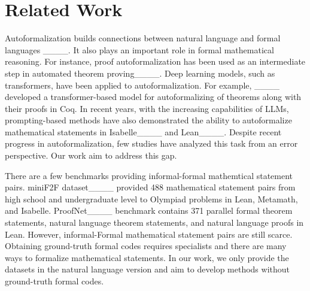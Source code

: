 \section{Related Work}
Autoformalization builds connections between natural language and formal languages ____. It also plays an important role in formal mathematical reasoning. For instance, proof autoformalization has been used as an intermediate step in automated theorem proving____. Deep learning models, such as transformers, have been applied to autoformalization. For example, ____ developed a transformer-based model for autoformalizing of theorems along with their proofs in Coq. In recent years, with the increasing capabilities of LLMs, prompting-based methods have also demonstrated the ability to autoformalize mathematical statements in Isabelle____ and Lean____. Despite recent progress in autoformalization, few studies have analyzed this task from an error perspective. Our work aim to address this gap.

There are a few benchmarks providing informal-formal mathemtical statement pairs. miniF2F dataset____ provided 488 mathematical statement pairs from high school and undergraduate level to Olympiad problems in Lean, Metamath, and Isabelle. ProofNet____ benchmark contains 371 parallel formal theorem statements, natural language theorem statements, and natural language proofs in Lean. However, informal-Formal mathematical statement pairs are still scarce. Obtaining ground-truth formal codes requires specialists and there are many ways to formalize mathematical statements. In our work, we only provide the datasets in the natural language version and aim to develop methods without ground-truth formal codes.

